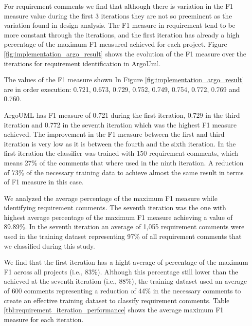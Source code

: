 For requirement \SATD comments we find that although there is variation in the F1 measure value during the first 3 iterations they are not so preeminent as the variation found in design \SATD analysis. The F1 measure in requirement \SATD tend to be more constant through the iterations, and the first iteration has already a high percentage of the maximum F1 measured achieved for each project. Figure \ref{fig:implementation_argo_result} shows the evolution of the F1 measure over the iterations for requirement \SATD identification in ArgoUml. 

The values of the F1 measure shown In Figure \ref{fig:implementation_argo_result} are in order execution: 0.721, 0.673, 0.729, 0.752, 0.749, 0.754, 0.772, 0.769 and 0.760.

ArgoUML has F1 measure of 0.721 during the first iteration, 0.729 in the third iteration and 0.772 in the seventh iteration which was the highest F1 measure achieved. The improvement in the F1 measure between the first and third iteration is very low as it is between the fourth and the sixth iteration. In the first iteration the classifier was trained with 150 requirement \SATD comments, which means 27\% of the comments that where used in the ninth iteration. A reduction of 73\% of the necessary training data to achieve almost the same result in terms of F1 measure in this case. 

We analyzed the average percentage of the maximum F1 measure while identifying requirement \SATD comments. The seventh iteration was the one with highest average percentage of the maximum F1 measure achieving a value of 89.89\%. In the seventh iteration an average of 1,055 requirement \SATD comments were used in the training dataset representing 97\% of all requirement \SATD comments that we classified during this study.

We find that the first iteration has a hight average of percentage of the maximum F1 across all projects (i.e., 83\%). Although this percentage still lower than the achieved at the seventh iteration (i.e., 88\%), the training dataset used an average of 600 \SATD comments representing a reduction of 44\% in the necessary comments to create an effective training dataset to classify requirement \SATD comments. Table \ref{tbl:requirement_iteration_performance} shows the average maximum F1 measure for each iteration. 

